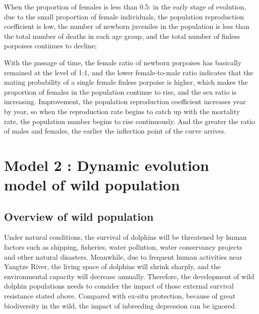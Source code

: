 \documentclass[12pt]{article}  %
\begin{document}
When the proportion of females is less than 0.5: in the early stage of evolution, due to the small proportion of female individuals, the population reproduction coefficient is low, the number of newborn juveniles in the population is less than the total number of deaths in each age group, and the total number of finless porpoises continues to decline;

With the passage of time, the female ratio of newborn porpoises has basically remained at the level of 1:1, and the lower female-to-male ratio indicates that the mating probability of a single female finless porpoise is higher, which makes the proportion of females in the population continue to rise, and the sex ratio is increasing. Improvement, the population reproduction coefficient increases year by year, so when the reproduction rate begins to catch up with the mortality rate, the population number begins to rise continuously.
And the greater the ratio of males and females, the earlier the inflection point of the curve arrives.

\section{Model 2 : Dynamic evolution model of wild population}
\subsection{Overview of wild population}
Under natural conditions, the survival of dolphins will be threatened by human factors such as shipping, fisheries, water pollution, water conservancy projects and other natural disasters. Meanwhile, due to frequent human activities near Yangtze River, the living space of dolphins will shrink sharply, and the environmental capacity will decrease annually. Therefore, the development of wild dolphin populations needs to consider the impact of those external survival resistance stated above. Compared with ex-situ protection, because of great biodiversity in the wild, the impact of inbreeding depression can be ignored.
\end{document}
